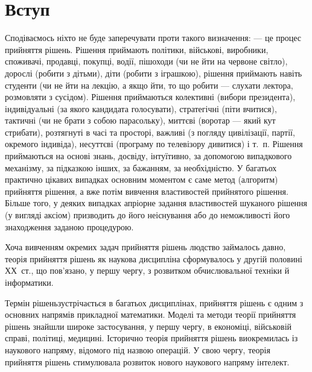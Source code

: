\documentclass[a4paper, 12pt]{article}
\begin{document}
\tableofcontents

\section*{Вступ}

Сподіваємось ніхто не буде заперечувати проти такого визначення:  --- це процес прийняття рішень\guillemotright. Рішення приймають політики, військові, виробники, споживачі, продавці, покупці, водії, пішоходи ( чи не йти на червоне світло\guillemotright), дорослі ( робити з дітьми\guillemotright), діти ( робити з іграшкою\guillemotright), рішення приймають навіть студенти ( чи не йти на лекцію, а якщо йти, то що робити --- слухати лектора, розмовляти з сусідом\guillemotright). Рішення приймаються колективні (вибори президента), індивідуальні (за якого кандидата голосувати), стратегічні ( піти вчитися\guillemotright), тактичні ( чи не брати з собою парасольку\guillemotright), миттєві (воротар ---  який кут стрибати\guillemotright), розтягнуті в часі та просторі, важливі (з погляду цивілізації, партії, окремого індивіда), несуттєві ( програму по телевізору дивитися\guillemotright) і т.~п. Рішення приймаються на основі знань, досвіду, інтуїтивно, за допомогою випадкового механізму, за підказкою інших, за бажанням, за необхідністю. У багатьох практично цікавих випадках основним моментом є саме метод (алгоритм) прийняття рішення, а вже потім вивчення властивостей прийнятого рішення. Більше того, у деяких випадках апріорне задання властивостей шуканого рішення (у вигляді аксіом) призводить до його неіснування або до неможливості його знаходження заданою процедурою. \medskip

Хоча вивченням окремих задач прийняття рішень людство займалось давно, теорія прийняття рішень як наукова дисципліна сформувалось у другій половині ХХ~ст., що пов'язано, у першу чергу, з розвитком обчислювальної техніки й інформатики. \medskip

Термін  рішень\guillemotright зустрічається в багатьох дисциплінах, прийняття рішень є одним з основних напрямів прикладної математики. Моделі та методи теорії прийняття рішень знайшли широке застосування, у першу чергу, в економіці, військовій справі, політиці, медицині. Історично теорія прийняття рішень виокремилась із наукового напряму, відомого під назвою  операцій\guillemotright. У свою чергу, теорія прийняття рішень стимулювала розвиток нового наукового напряму  інтелект\guillemotright. \medskip
\end{document}
